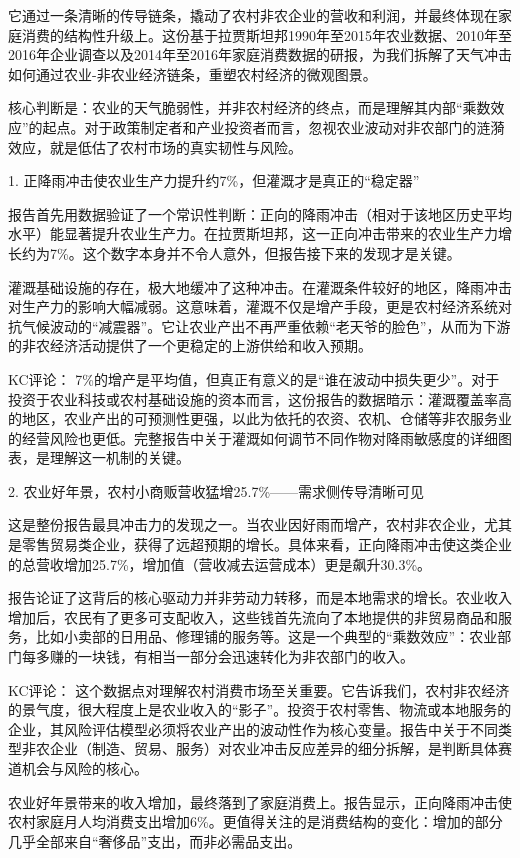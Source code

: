 \documentclass[11pt]{ctexart}
\begin{document}
它通过一条清晰的传导链条，撬动了农村非农企业的营收和利润，并最终体现在家庭消费的结构性升级上。这份基于拉贾斯坦邦1990年至2015年农业数据、2010年至2016年企业调查以及2014年至2016年家庭消费数据的研报，为我们拆解了天气冲击如何通过农业-非农业经济链条，重塑农村经济的微观图景。

核心判断是：农业的天气脆弱性，并非农村经济的终点，而是理解其内部“乘数效应”的起点。对于政策制定者和产业投资者而言，忽视农业波动对非农部门的涟漪效应，就是低估了农村市场的真实韧性与风险。

1. 正降雨冲击使农业生产力提升约7\%，但灌溉才是真正的“稳定器”

报告首先用数据验证了一个常识性判断：正向的降雨冲击（相对于该地区历史平均水平）能显著提升农业生产力。在拉贾斯坦邦，这一正向冲击带来的农业生产力增长约为7\%。这个数字本身并不令人意外，但报告接下来的发现才是关键。

灌溉基础设施的存在，极大地缓冲了这种冲击。在灌溉条件较好的地区，降雨冲击对生产力的影响大幅减弱。这意味着，灌溉不仅是增产手段，更是农村经济系统对抗气候波动的“减震器”。它让农业产出不再严重依赖“老天爷的脸色”，从而为下游的非农经济活动提供了一个更稳定的上游供给和收入预期。

KC评论： 7\%的增产是平均值，但真正有意义的是“谁在波动中损失更少”。对于投资于农业科技或农村基础设施的资本而言，这份报告的数据暗示：灌溉覆盖率高的地区，农业产出的可预测性更强，以此为依托的农资、农机、仓储等非农服务业的经营风险也更低。完整报告中关于灌溉如何调节不同作物对降雨敏感度的详细图表，是理解这一机制的关键。

2. 农业好年景，农村小商贩营收猛增25.7\%——需求侧传导清晰可见

这是整份报告最具冲击力的发现之一。当农业因好雨而增产，农村非农企业，尤其是零售贸易类企业，获得了远超预期的增长。具体来看，正向降雨冲击使这类企业的总营收增加25.7\%，增加值（营收减去运营成本）更是飙升30.3\%。

报告论证了这背后的核心驱动力并非劳动力转移，而是本地需求的增长。农业收入增加后，农民有了更多可支配收入，这些钱首先流向了本地提供的非贸易商品和服务，比如小卖部的日用品、修理铺的服务等。这是一个典型的“乘数效应”：农业部门每多赚的一块钱，有相当一部分会迅速转化为非农部门的收入。

KC评论： 这个数据点对理解农村消费市场至关重要。它告诉我们，农村非农经济的景气度，很大程度上是农业收入的“影子”。投资于农村零售、物流或本地服务的企业，其风险评估模型必须将农业产出的波动性作为核心变量。报告中关于不同类型非农企业（制造、贸易、服务）对农业冲击反应差异的细分拆解，是判断具体赛道机会与风险的核心。

农业好年景带来的收入增加，最终落到了家庭消费上。报告显示，正向降雨冲击使农村家庭月人均消费支出增加6\%。更值得关注的是消费结构的变化：增加的部分几乎全部来自“奢侈品”支出，而非必需品支出。
\end{document}
